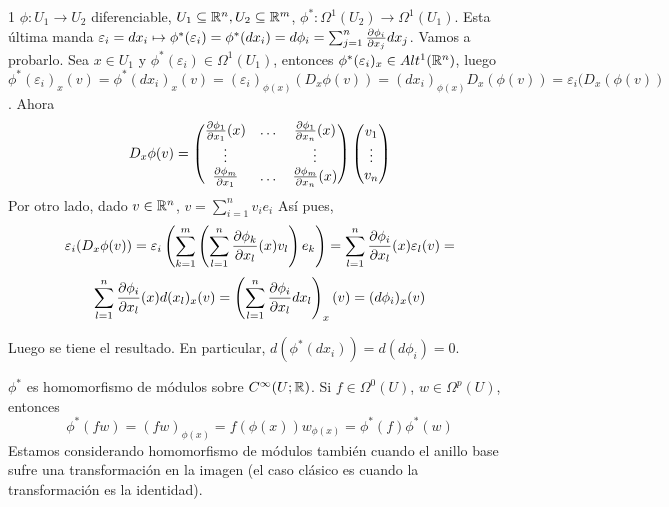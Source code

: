 \documentclass[CV.tex]{subfiles}
\begin{document}
\begin{ej}1
$\phi:U_1\to U_2$ diferenciable, $U_1\subseteq\mathbb{R}^n, U_2\subseteq\mathbb{R}^m$, $\phi^*:\Omega^1(U_2)\to \Omega^1(U_1)$. Esta última manda $\varepsilon_i=dx_i\mapsto \phi^*(\varepsilon_i)=\phi^*(dx_i)=d\phi_i=\sum_{j=1}^n\frac{\partial \phi_i}{\partial x_j}dx_j$. Vamos a probarlo. Sea $x\in U_1$ y $\phi^*(\varepsilon_i)\in\Omega^1(U_1)$, entonces $\phi^*(\varepsilon_i)_x\in Alt^1(\mathbb{R}^n)$, luego $\phi^*(\varepsilon_i)_x(v)=\phi^*(dx_i)_x(v)=(\varepsilon_i)_{\phi(x)}(D_x\phi(v))=(dx_i)_{\phi(x)}D_x(\phi(v))=\varepsilon_i(D_x(\phi(v))$. Ahora
\[
D_x\phi(v)=\begin{pmatrix}
\frac{\partial \phi_1}{\partial x_1}(x) & \dots & \frac{\partial \phi_1}{\partial x_n}(x)\\
\vdots & & \vdots \\
\frac{\partial \phi_m}{\partial x_1} & \dots & \frac{\partial \phi_m}{\partial x_n}(x)
\end{pmatrix}\begin{pmatrix}
v_1\\
\vdots\\
v_n
\end{pmatrix}
\]
Por otro lado, dado $v\in\mathbb{R}^n$, $v=\sum_{i=1}^nv_ie_i$ Así pues, 
\[
\varepsilon_i(D_x\phi(v))=\varepsilon_i\left(\sum_{k=1}^m\left(\sum_{l=1}^n\frac{\partial \phi_k}{\partial x_l}(x)v_l\right)e_k\right)=\sum_{l=1}^n\frac{\partial \phi_i}{\partial x_l}(x)\varepsilon_l(v)=
\]
\[
\sum_{l=1}^n\frac{\partial \phi_i}{\partial x_l}(x)d(x_l)_x(v)=\left(\sum_{l=1}^n\frac{\partial \phi_i}{\partial x_l}dx_l\right)_x(v)=(d\phi_i)_x(v)
\]

Luego se tiene el resultado. En particular, $d(\phi^*(dx_i))=d(d\phi_i)=0$. 
\end{ej}

\begin{nota}
$\phi^*$ es homomorfismo de módulos sobre $C^{\infty}(U;\mathbb{R})$. Si $f\in\Omega^0(U)$, $w\in\Omega^p(U)$, entonces 
\[
\phi^*(fw)=(fw)_{\phi(x)}=f(\phi(x))w_{\phi(x)}=\phi^*(f)\phi^*(w)
\]
Estamos considerando homomorfismo de módulos también cuando el anillo base sufre una transformación en la imagen (el caso clásico es cuando la transformación es la identidad).
\end{nota}
\end{document}
